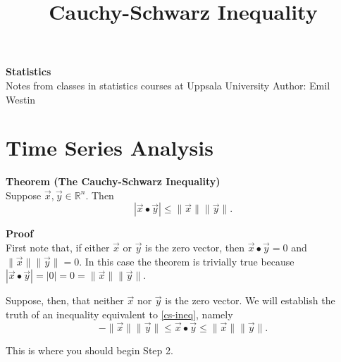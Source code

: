 \documentclass[11pt]{article}
\begin{document}
\title{Cauchy-Schwarz Inequality}

\thispagestyle{empty}

\begin{center}
{\LARGE \bf Statistics}\\
Notes from classes in statistics courses at Uppsala University
Author: Emil Westin
\end{center}

\section{Time Series Analysis}


\textbf{Theorem (The Cauchy-Schwarz Inequality)}\\
Suppose $\vec{x},\vec{y} \in \mathbb{R}^n$. Then 
\begin{equation}
|\vec{x} \bullet \vec{y}| \le \|\vec{x}\| \|\vec{y}\| \label{cs-ineq}.
\end{equation}

\textbf{Proof}\\
First note that, if either $\vec{x}$ or $\vec{y}$ is the zero vector, 
then $\vec{x} \bullet \vec{y} = 0$ and $\|\vec{x}\| \|\vec{y}\| = 0$. 
In this case the theorem is trivially true because 
$|\vec{x} \bullet \vec{y}| = |0| = 0 = \|\vec{x}\| \|\vec{y}\|$.

Suppose, then, that neither $\vec{x}$ nor $\vec{y}$ is the zero vector. 
We will establish the truth of an inequality equivalent to \eqref{cs-ineq}, 
namely
\begin{equation}
-\|\vec{x}\| \|\vec{y}\| \le \vec{x} \bullet \vec{y} \le 
\|\vec{x}\| \|\vec{y}\|. \label{cs-ineq-alt}
\end{equation}


\clearpage

This is where you should begin Step 2.
\end{document}

